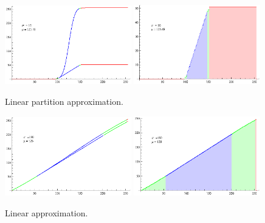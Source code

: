 \begin{figure}[h!]
  \caption{Linear partition approximation.}
  \label{fig:Partition}
  \centering
    \includegraphics[width=0.49\textwidth]{Chapter2/Figs/partitionSmooth2.eps}
    \includegraphics[width=0.49\textwidth]{Chapter2/Figs/partitionColor2.eps}
\end{figure}

\begin{figure}[h!]
  \caption{Linear approximation.}
  \label{fig:Linear}
  \centering
    \includegraphics[width=0.49\textwidth]{Chapter2/Figs/linearSmooth2.eps}
    \includegraphics[width=0.49\textwidth]{Chapter2/Figs/linearColor2.eps}
\end{figure}

